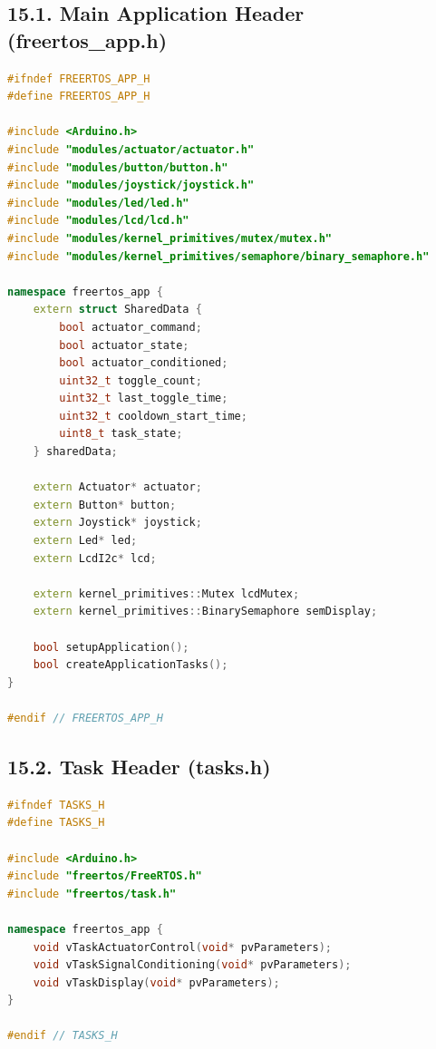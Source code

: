 \documentclass[12pt]{article}
\begin{document}
\subsection*{15.1. Main Application Header (freertos\_app.h)}

\begin{lstlisting}[language=C++, caption=freertos\_app.h - Application Interface]
#ifndef FREERTOS_APP_H
#define FREERTOS_APP_H

#include <Arduino.h>
#include "modules/actuator/actuator.h"
#include "modules/button/button.h"
#include "modules/joystick/joystick.h"
#include "modules/led/led.h"
#include "modules/lcd/lcd.h"
#include "modules/kernel_primitives/mutex/mutex.h"
#include "modules/kernel_primitives/semaphore/binary_semaphore.h"

namespace freertos_app {
    extern struct SharedData {
        bool actuator_command;
        bool actuator_state;
        bool actuator_conditioned;
        uint32_t toggle_count;
        uint32_t last_toggle_time;
        uint32_t cooldown_start_time;
        uint8_t task_state;
    } sharedData;
    
    extern Actuator* actuator;
    extern Button* button;
    extern Joystick* joystick;
    extern Led* led;
    extern LcdI2c* lcd;
    
    extern kernel_primitives::Mutex lcdMutex;
    extern kernel_primitives::BinarySemaphore semDisplay;
    
    bool setupApplication();
    bool createApplicationTasks();
}

#endif // FREERTOS_APP_H
\end{lstlisting}

\subsection*{15.2. Task Header (tasks.h)}

\begin{lstlisting}[language=C++, caption=tasks.h - Task Interface]
#ifndef TASKS_H
#define TASKS_H

#include <Arduino.h>
#include "freertos/FreeRTOS.h"
#include "freertos/task.h"

namespace freertos_app {
    void vTaskActuatorControl(void* pvParameters);
    void vTaskSignalConditioning(void* pvParameters);
    void vTaskDisplay(void* pvParameters);
}

#endif // TASKS_H
\end{lstlisting}
\end{document}

